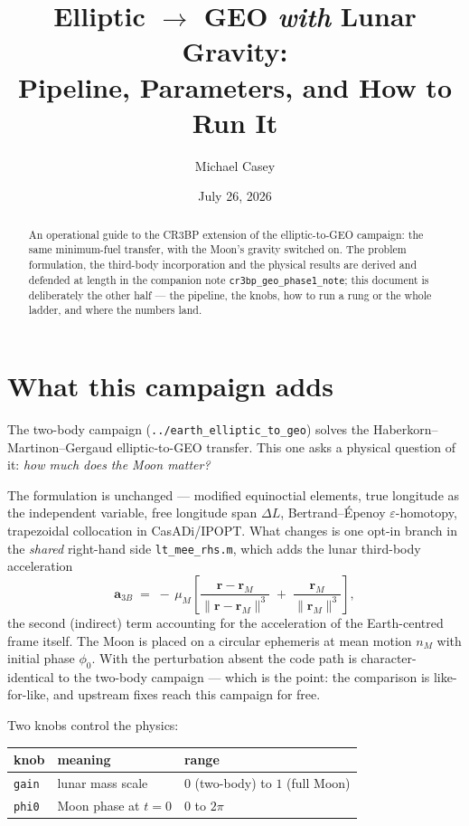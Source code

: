 \documentclass[11pt]{article}
\title{Elliptic $\to$ GEO \emph{with} Lunar Gravity: \\
Pipeline, Parameters, and How to Run It}
\author{Michael Casey}
\date{July 26, 2026}
\newcommand{\vect}[1]{\bm{#1}}
\newcommand{\file}[1]{\texttt{#1}}
\begin{document}
\maketitle

\begin{abstract}
An operational guide to the CR3BP extension of the elliptic-to-GEO campaign:
the same minimum-fuel transfer, with the Moon's gravity switched on. The
problem formulation, the third-body incorporation and the physical results are
derived and defended at length in the companion note
\file{cr3bp\_geo\_phase1\_note}; this document is deliberately the other half
--- the pipeline, the knobs, how to run a rung or the whole ladder, and where
the numbers land.
\end{abstract}

\tableofcontents

\section{What this campaign adds}

The two-body campaign (\file{../earth\_elliptic\_to\_geo}) solves the
Haberkorn--Martinon--Gergaud elliptic-to-GEO transfer. This one asks a physical
question of it: \emph{how much does the Moon matter?}

The formulation is unchanged --- modified equinoctial elements, true longitude
as the independent variable, free longitude span $\Delta L$, Bertrand--\'Epenoy
$\varepsilon$-homotopy, trapezoidal collocation in CasADi/IPOPT. What changes
is one opt-in branch in the \emph{shared} right-hand side
\file{lt\_mee\_rhs.m}, which adds the lunar third-body acceleration
\begin{equation}
\vect{a}_{3B} \;=\; -\,\mu_M\!\left[
\frac{\vect{r}-\vect{r}_M}{\|\vect{r}-\vect{r}_M\|^{3}}
\;+\;\frac{\vect{r}_M}{\|\vect{r}_M\|^{3}} \right],
\end{equation}
the second (indirect) term accounting for the acceleration of the Earth-centred
frame itself. The Moon is placed on a circular ephemeris at mean motion $n_M$
with initial phase $\phi_0$. With the perturbation absent the code path is
character-identical to the two-body campaign --- which is the point: the
comparison is like-for-like, and upstream fixes reach this campaign for free.

Two knobs control the physics:
\begin{center}
\begin{tabular}{lll}
\toprule
knob & meaning & range \\
\midrule
\texttt{gain} & lunar mass scale & $0$ (two-body) to $1$ (full Moon) \\
\texttt{phi0} & Moon phase at $t=0$ & $0$ to $2\pi$ \\
\bottomrule
\end{tabular}
\end{center}
\end{document}
